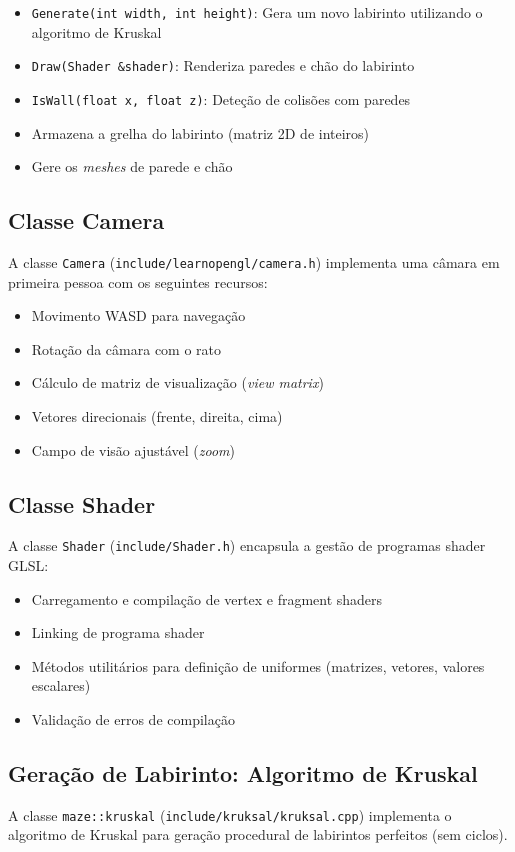 \begin{itemize}
    \item \texttt{Generate(int width, int height)}: Gera um novo labirinto utilizando o algoritmo de Kruskal
    \item \texttt{Draw(Shader \&shader)}: Renderiza paredes e chão do labirinto
    \item \texttt{IsWall(float x, float z)}: Deteção de colisões com paredes
    \item Armazena a grelha do labirinto (matriz 2D de inteiros)
    \item Gere os \textit{meshes} de parede e chão
\end{itemize}

\subsection{Classe Camera}
A classe \texttt{Camera} (\texttt{include/learnopengl/camera.h}) implementa uma câmara em primeira pessoa com os seguintes recursos:

\begin{itemize}
    \item Movimento WASD para navegação
    \item Rotação da câmara com o rato
    \item Cálculo de matriz de visualização (\textit{view matrix})
    \item Vetores direcionais (frente, direita, cima)
    \item Campo de visão ajustável (\textit{zoom})
\end{itemize}

\subsection{Classe Shader}
A classe \texttt{Shader} (\texttt{include/Shader.h}) encapsula a gestão de programas shader GLSL:

\begin{itemize}
    \item Carregamento e compilação de vertex e fragment shaders
    \item Linking de programa shader
    \item Métodos utilitários para definição de uniformes (matrizes, vetores, valores escalares)
    \item Validação de erros de compilação
\end{itemize}

\subsection{Geração de Labirinto: Algoritmo de Kruskal}
A classe \texttt{maze::kruskal} (\texttt{include/kruksal/kruksal.cpp}) implementa o algoritmo de Kruskal para geração procedural de labirintos perfeitos (sem ciclos).

